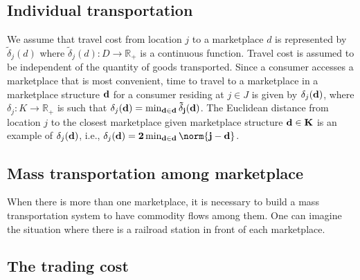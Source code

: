 \subsection{Individual transportation}

We assume that travel cost from location $j$ to a marketplace $d$ is represented by $\tilde{\delta}_j(d)$ where $\tilde{\delta}_j(d): D \to \mathbb{R}_+$ is a continuous function. Travel cost is assumed to be independent of the quantity of goods transported. Since a consumer accesses a marketplace that is most convenient, time to travel to a marketplace in a marketplace structure $\bf{d}$ for a consumer residing at $j \in J$ is given by $\delta_j(\bf{d})$, where $\delta_j: K \to \mathbb{R}_+$ is such that $\delta_j(\bf{d}) = \min_{d \in \bf{d}} \tilde{\delta}_j(d)$. The Euclidean distance from location $j$ to the closest marketplace given marketplace structure $\bf{d} \in K$ is an example of $\delta_j(\bf{d})$, i.e., $\delta_j(\bf{d}) = 2 \min_{d \in \bf{d}} \norm{j - d}$.

\subsection{Mass transportation among marketplace}

When there is more than one marketplace, it is necessary to build a mass transportation system to have commodity flows among them. One can imagine the situation where there is a railroad station in front of each marketplace.

\subsection{The trading cost}

